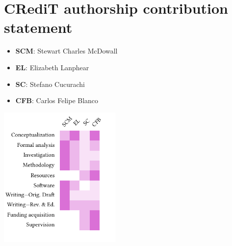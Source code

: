 \documentclass[review,3p,authoryear]{elsarticle}
\newcommand{\cbox}[1]{
    \begin{tcolorbox}[hbox, colback=red!5!white, colframe=red!65!black, boxrule=0.25pt, boxsep=2pt, left=2pt, right=2pt, top=1pt, bottom=1pt]
        \small\sffamily #1
    \end{tcolorbox}
}
\begin{document}

\section*{CRediT authorship contribution statement}

\begin{itemize}[noitemsep]
    \item \textbf{SCM}: Stewart Charles McDowall
    \item \textbf{EL}: Elizabeth Lanphear
    \item \textbf{SC}: Stefano Cucurachi
    \item \textbf{CFB}: Carlos Felipe Blanco
\end{itemize}

\includegraphics[width=\columnwidth, height=7cm, keepaspectratio]{credit.pdf}
\end{document}
